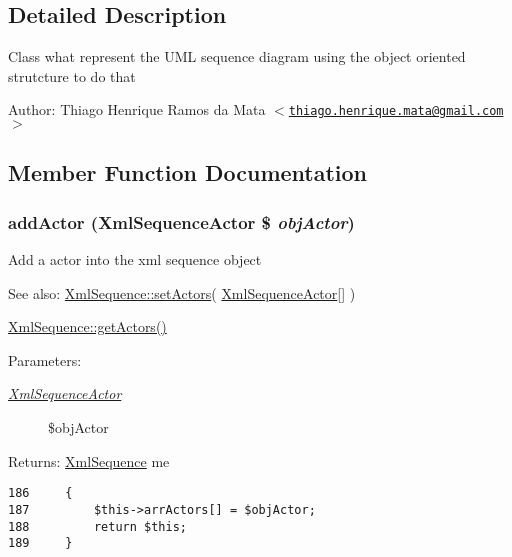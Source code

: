 \subsection{Detailed Description}
Class what represent the UML sequence diagram using the object oriented strutcture to do that

\begin{Desc}
\item[Author:]Thiago Henrique Ramos da Mata $<$\href{mailto:thiago.henrique.mata@gmail.com}{\tt thiago.henrique.mata@gmail.com}$>$ \end{Desc}


\subsection{Member Function Documentation}
\hypertarget{class_xml_sequence_74d90b5972a5dfb4ce6d4ea96c2b3ea2}{
\subsubsection[{addActor}]{\setlength{\rightskip}{0pt plus 5cm}addActor ({\bf XmlSequenceActor} \$ {\em objActor})}}
\label{class_xml_sequence_74d90b5972a5dfb4ce6d4ea96c2b3ea2}


Add a actor into the xml sequence object

\begin{Desc}
\item[See also:]\hyperlink{class_xml_sequence_3ffb44470b89a8f309c8e18159bdac24}{XmlSequence::setActors}( \hyperlink{class_xml_sequence_actor}{XmlSequenceActor}\mbox{[}\mbox{]} ) 

\hyperlink{class_xml_sequence_c5620e43921e5f05c953d7afd78b6bcd}{XmlSequence::getActors()} \end{Desc}
\begin{Desc}
\item[Parameters:]
\begin{description}
\item[{\em \hyperlink{class_xml_sequence_actor}{XmlSequenceActor}}]\$objActor \end{description}
\end{Desc}
\begin{Desc}
\item[Returns:]\hyperlink{class_xml_sequence}{XmlSequence} me \end{Desc}


\begin{Code}\begin{verbatim}186     {
187         $this->arrActors[] = $objActor;
188         return $this;
189     }
\end{verbatim}
\end{Code}



